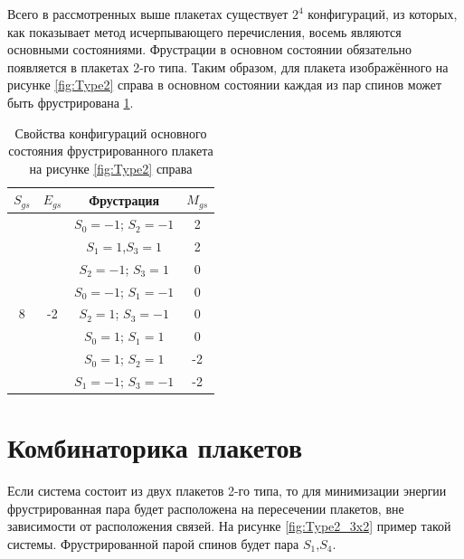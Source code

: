 \documentclass[utf8, babel, sor, jor, amsmath, amssymb, reprint]{elsarticle} %
\begin{document}
Всего в рассмотренных выше плакетах существует $2^4$ конфигураций, из которых, как показывает метод исчерпывающего перечисления, восемь являются основными состояниями. 
Фрустрации в основном состоянии обязательно появляется в плакетах 2-го типа. 
Таким образом, для плакета изображённого на рисунке \ref{fig:Type2} справа в основном состоянии каждая из пар спинов может быть фрустрирована \ref{tab:Strunags}.

\begin{table}[H]
		\centering
	\begin{tabular}{|c|c|c|c|}
	
		\hline
	 $S_{gs}$	& $E_{gs}$    & Фрустрация  &   $M_{gs}$   \\
	\hline
	    & & 	$S_0=-1$; $S_2=-1$ & 2   \\ 	\cline{3-4}
	   	& & $S_1=1$,$S_3=1$        & 2\\ 	\cline{3-4}
		& &  $S_2=-1$; $S_3=1$     & 0    \\ \cline{3-4} 
        &  & $S_0=-1$; $S_1=-1$ &	0  \\ 
		\cline{3-4} 
		8	\multirow{3}{*}{} & -2 \multirow{3}{*}{} & $S_2=1$;  $S_3=-1$     &  0\\ \cline{3-4}	
		& & $S_0=1$;  $S_1=1$      &  0\\ \cline{3-4}
		& &	$S_0=1$;  $S_2=1$      &  -2\\ \cline{3-4}
		& &	$S_1=-1$; $S_3=-1$     & -2\\ \hline
	
	\end{tabular}
	\caption{Свойства конфигураций основного состояния фрустрированного плакета на рисунке \ref{fig:Type2} справа}
	\label{tab:Strunags}
\end{table}

\section{Комбинаторика плакетов}
  
Если система состоит из двух плакетов 2-го типа, то для минимизации энергии фрустрированная пара будет расположена на пересечении плакетов, вне зависимости от расположения связей. На рисунке \ref{fig:Type2_3x2} пример такой системы. Фрустрированной парой спинов будет пара $S_1$,$S_4$.
\end{document}
